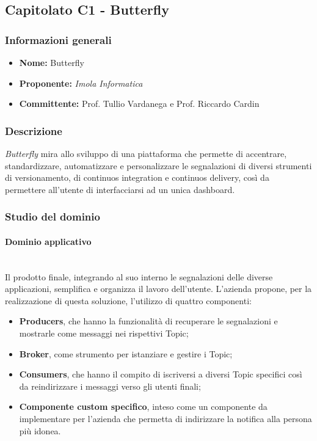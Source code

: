 \subsection{Capitolato C1 - Butterfly}
\subsubsection{Informazioni generali}
\begin{itemize}
\item
\textbf{Nome:} Butterfly 
\item
\textbf{Proponente:} \textit{Imola Informatica} 
\item
\textbf{Committente:} Prof. Tullio Vardanega e Prof. Riccardo Cardin
\end{itemize}
\subsubsection{Descrizione}
\textit{Butterfly} mira allo sviluppo di una piattaforma che permette di accentrare, standardizzare, automatizzare e personalizzare le segnalazioni di diversi strumenti di versionamento, di continuos integration e continuos delivery, così da permettere all'utente di interfacciarsi ad un unica dashboard.
\subsubsection{Studio del dominio}
\paragraph{Dominio applicativo}\mbox{}\\
Il prodotto finale, integrando al suo interno le segnalazioni delle diverse applicazioni, semplifica e organizza il lavoro dell'utente. L'azienda propone, per la realizzazione di questa soluzione, l'utilizzo di quattro componenti:
\begin{itemize}
	\item \textbf{Producers}, che hanno la funzionalità di recuperare le segnalazioni e mostrarle come messaggi nei rispettivi Topic;
	\item \textbf{Broker}, come strumento per istanziare e gestire i Topic;
	\item \textbf{Consumers}, che hanno il compito di iscriversi a diversi Topic specifici così da reindirizzare i messaggi verso gli utenti finali;
    \item \textbf{Componente custom specifico}, inteso come un componente da implementare per l'azienda che permetta di indirizzare la notifica alla persona più idonea.
\end{itemize}
